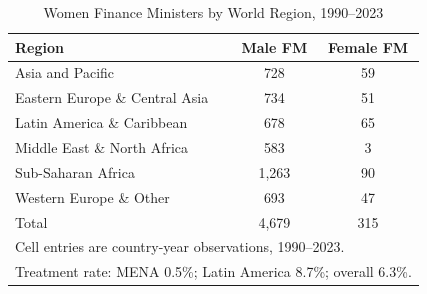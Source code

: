 \begin{table}[htbp]\centering
\def\sym#1{\ifmmode^{#1}\else\(^{#1}\)\fi}
\caption{Women Finance Ministers by World Region, 1990--2023}
\label{tab:region}
\begin{tabular}{lcc}
\hline\hline
Region & Male FM & Female FM \\
\hline
Asia and Pacific              & 728   &  59 \\
Eastern Europe \& Central Asia & 734  &  51 \\
Latin America \& Caribbean    & 678   &  65 \\
Middle East \& North Africa   & 583   &   3 \\
Sub-Saharan Africa            & 1,263 &  90 \\
Western Europe \& Other       & 693   &  47 \\
\hline
Total                         & 4,679 & 315 \\
\hline\hline
\multicolumn{3}{l}{\footnotesize Cell entries are country-year observations, 1990--2023.}\\
\multicolumn{3}{l}{\footnotesize Treatment rate: MENA 0.5\%; Latin America 8.7\%; overall 6.3\%.}\\
\end{tabular}
\end{table}
